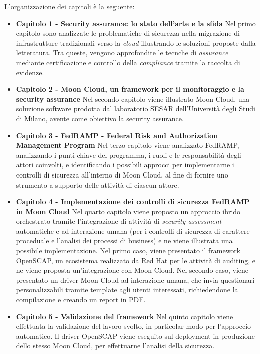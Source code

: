 \documentclass[../main.tex]{subfiles}
\begin{document}
L'organizzazione dei capitoli è la seguente:
\begin{itemize}
    \item \textbf{Capitolo 1 - Security assurance: lo stato dell'arte e la sfida}
        Nel primo capitolo sono analizzate le problematiche di sicurezza nella migrazione di infrastrutture tradizionali verso la \textit{cloud} illustrando le soluzioni proposte dalla letteratura.
        Tra queste, vengono approfondite le tecnche di \textit{assurance} mediante certificazione e controllo della \textit{compliance} tramite la raccolta di evidenze.
    \item \textbf{Capitolo 2 - Moon Cloud, un framework per il monitoraggio e la security assurance}
        Nel secondo capitolo viene illustrato Moon Cloud, una soluzione software prodotta dal laboratorio SESAR dell'Università degli Studi di Milano, avente come obiettivo la security assurance.
    \item \textbf{Capitolo 3 - FedRAMP - Federal Risk and Authorization Management Program}
        Nel terzo capitolo viene analizzato FedRAMP, analizzando i punti chiave del programma, i ruoli e le responsabilità degli attori coinvolti, e identificando
        i possibili approcci per implementarne i controlli di sicurezza all'interno di Moon Cloud, al fine di fornire uno strumento a supporto delle attività di ciascun attore.
    \item \textbf{Capitolo 4 - Implementazione dei controlli di sicurezza FedRAMP in Moon Cloud}
        Nel quarto capitolo viene proposto un approccio ibrido orchestrato tramite l'integrazione di attività di \textit{security assessment} automatiche e ad interazione umana (per i controlli di sicurezza di carattere proceduale e l'analisi dei processi di business)
        e ne viene illustrata una possibile implementazione.
        Nel primo caso, viene presentato il framework OpenSCAP, un ecosistema realizzato da Red Hat per le attività di auditing, e ne viene proposta un'integrazione con Moon Cloud.
        Nel secondo caso, viene presentato un driver Moon Cloud ad interazione umana, che invia questionari personalizzabili tramite template agli utenti interessati, richiedendone la compilazione e creando un report in PDF.
    \item \textbf{Capitolo 5 - Validazione del framework}
        Nel quinto capitolo viene effettuata la validazione del lavoro svolto, in particolar modo per l'approccio automatico. Il driver OpenSCAP viene eseguito sul deployment in produzione dello stesso Moon Cloud, per effettuarne l'analisi della sicurezza.

\end{itemize}
\end{document}
